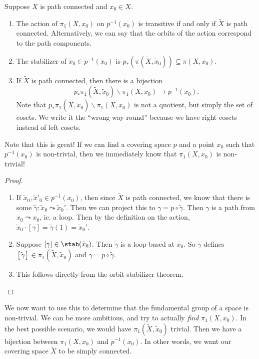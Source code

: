 \documentclass[a4paper]{article}
\begin{document}
\begin{lemma}
  Suppose $X$ is path connected and $x_0 \in X$.
  \begin{enumerate}
    \item The action of $\pi_1(X, x_0)$ on $p^{-1}(x_0)$ is transitive if and only if $\tilde{X}$ is path connected. Alternatively, we can say that the orbits of the action correspond to the path components.
    \item The stabilizer of $\tilde{x}_0 \in p^{-1}(x_0)$ is $p_*(\pi(\tilde{X}, \tilde{x}_0)) \subseteq \pi(X, x_0)$.
    \item If $\tilde{X}$ is path connected, then there is a bijection
      \[
        p_* \pi_1(\tilde{X}, \tilde{x}_0)\backslash \pi_1(X, x_0) \to p^{-1}(x_0).
      \]
      Note that $p_* \pi_1(\tilde{X}, \tilde{x}_0)\backslash \pi_1(X, x_0)$ is not a quotient, but simply the set of cosets. We write it the ``wrong way round'' because we have right cosets instead of left cosets.
  \end{enumerate}
\end{lemma}
Note that this is great! If we can find a covering space $p$ and a point $x_0$ such that $p^{-1}(x_0)$ is non-trivial, then we immediately know that $\pi_1(X, x_0)$ is non-trivial!

\begin{proof}\leavevmode
  \begin{enumerate}
    \item If $\tilde{x}_0, \tilde{x}'_0 \in p^{-1}(x_0)$, then since $\tilde{X}$ is path connected, we know that there is some $\tilde{\gamma}: \tilde{x}_0 \leadsto \tilde{x}_0'$. Then we can project this to $\gamma = p\circ \tilde{\gamma}$. Then $\gamma$ is a path from $x_0 \leadsto x_0$, ie. a loop. Then by the definition on the action, $\tilde{x}_0 \cdot [\gamma] = \tilde{\gamma}(1) = \tilde{x}_0'$.

    \item Suppose $[\gamma] \in \stab(\tilde{x}_0)$. Then $\tilde{\gamma}$ is a loop based at $\tilde{x_0}$. So $\tilde{\gamma}$ defines $[\tilde{\gamma}] \in \pi_1(\tilde{X}, \tilde{x}_0)$ and $\gamma = p\circ \tilde{\gamma}$.

    \item This follows directly from the orbit-stabilizer theorem.
  \end{enumerate}
\end{proof}

We now want to use this to determine that the fundamental group of a space is non-trivial. We can be more ambitious, and try to actually \emph{find} $\pi_1(X, x_0)$. In the best possible scenario, we would have $\pi_1(\tilde{X}, \tilde{x}_0)$ trivial. Then we have a bijection between $\pi_1(X, x_0)$ and $p^{-1}(x_0)$. In other words, we want our covering space $\tilde{X}$ to be simply connected.
\end{document}
